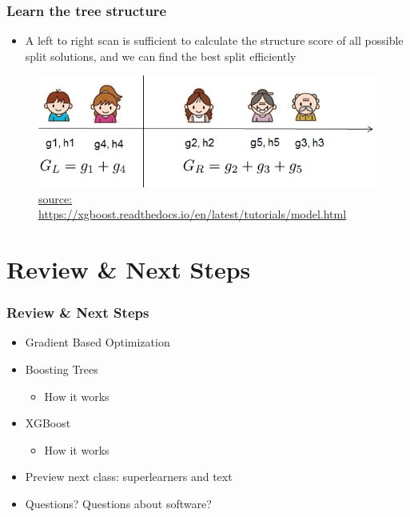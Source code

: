 \documentclass[
  shownotes,
  xcolor={svgnames},
  hyperref={colorlinks,citecolor=DarkBlue,linkcolor=DarkRed,urlcolor=DarkBlue}
  , aspectratio=169]{beamer}
\begin{document}
\begin{frame}[fragile]
\frametitle{Learn the tree structure}

\begin{itemize}

\item A left to right scan is sufficient to calculate the structure score of all possible split solutions, and we can find the best split efficiently
\end{itemize}

  \begin{figure}[H] \centering
            \captionsetup{justification=centering}
              \includegraphics[scale=0.6]{figures/tree_structure}
              \\
              \tiny
              \url{source: https://xgboost.readthedocs.io/en/latest/tutorials/model.html}
 \end{figure}
 
\end{frame}




\section{Review
 \& Next Steps}
\begin{frame}
\frametitle{Review \& Next Steps}
  
\begin{itemize} 
    \item Gradient Based Optimization
    \medskip
    \item Boosting Trees
    \begin{itemize}
      \item How it works
    \end{itemize}
    \item XGBoost
    \begin{itemize}
      \item How it works
    \end{itemize}
    \item Preview next class: superlearners and text
    \medskip  
    \item Questions? Questions about software? 

\end{itemize}
\end{frame}
\end{document}
